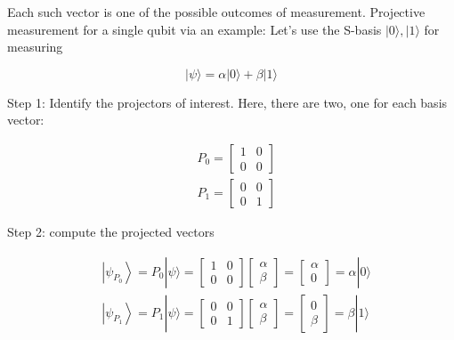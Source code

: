 \documentclass[main.tex]{subfiles}
\begin{document}
    Each such vector is one of the possible outcomes of measurement. Projective measurement for a single qubit via an example: Let's use the S-basis $|0\rangle,|1\rangle$ for measuring
    
    $$
    |\psi\rangle=\alpha|0\rangle+\beta|1\rangle
    $$
    
    Step 1: Identify the projectors of interest. Here, there are two, one for each basis vector:
    
    $$
    \begin{aligned}
    &P_{0}=\left[\begin{array}{ll}
    1 & 0 \\
    0 & 0
    \end{array}\right] \\
    &P_{1}=\left[\begin{array}{ll}
    0 & 0 \\
    0 & 1
    \end{array}\right]
    \end{aligned}
    $$
    
    Step 2: compute the projected vectors
    
    $$
    \begin{aligned}
    &\left|\psi_{P_{0}}\right\rangle=P_{0}|\psi\rangle=\left[\begin{array}{ll}
    1 & 0 \\
    0 & 0
    \end{array}\right]\left[\begin{array}{c}
    \alpha \\
    \beta
    \end{array}\right]=\left[\begin{array}{l}
    \alpha \\
    0
    \end{array}\right]=\alpha|0\rangle \\
    &\left|\psi_{P_{1}}\right\rangle=P_{1}|\psi\rangle=\left[\begin{array}{ll}
    0 & 0 \\
    0 & 1
    \end{array}\right]\left[\begin{array}{l}
    \alpha \\
    \beta
    \end{array}\right]=\left[\begin{array}{l}
    0 \\
    \beta
    \end{array}\right]=\beta|1\rangle
    \end{aligned}
    $$
    
\end{document}
